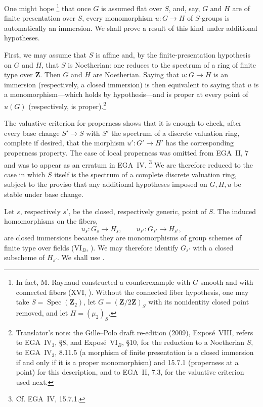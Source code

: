 One might hope\begingroup
\renewcommand{\thefootnote}{(\(\ast\))}%
\footnote[1]{In fact, M. Raynaud constructed a counterexample with \(G\)
smooth and with connected fibers (XVI, ). Without the connected
fiber hypothesis, one may take
\(S=\operatorname{Spec}(\mathbf Z_2)\), let
\(G=(\mathbf Z/2\mathbf Z)_S\) with its nonidentity closed point removed,
and let \(H=(\mu_2)_S\).}%
\endgroup
that once \(G\) is assumed flat over \(S\), and, say, \(G\) and \(H\) are
of finite presentation over \(S\), every monomorphism \(u:G\to H\) of
\(S\)-groups is automatically an immersion. We shall prove a result of this
kind under additional hypotheses.

First, we may assume that \(S\) is affine and, by the finite-presentation
hypothesis on \(G\) and \(H\), that \(S\) is Noetherian: one reduces to the
spectrum of a ring of finite type over \(\mathbf Z\). Then \(G\) and
\(H\) are Noetherian. Saying that \(u:G\to H\) is an immersion
(respectively, a closed immersion) is then equivalent to saying that \(u\)
is a monomorphism---which holds by hypothesis---and is proper at every point
of \(u(G)\) (respectively, is proper).\footnote{Translator's note: the Gille--Polo draft
re-edition (2009), Expos\'e~VIII, refers to EGA~IV\(_3\), \S8, and Expos\'e~VI\(_B\), \S10, for the
reduction to a Noetherian \(S\), to EGA~IV\(_3\), 8.11.5 (a morphism of finite presentation is a
closed immersion if and only if it is a proper monomorphism) and 15.7.1 (properness at a point) for
this description, and to EGA~II, 7.3, for the valuative criterion used next.}

The valuative criterion for properness shows that it is enough to check,
after every base change \(S'\to S\) with \(S'\) the spectrum of a discrete
valuation ring, complete if desired, that the morphism
\(u':G'\to H'\) has the corresponding properness property. The case of
local properness was omitted from EGA~II, 7 and was to appear as an
erratum in EGA~IV.\begingroup
\renewcommand{\thefootnote}{(\(\ast\))}%
\footnote[0]{Cf. EGA~IV, 15.7.1.}%
\endgroup
We are therefore reduced to the case in which \(S\) itself is the spectrum
of a complete discrete valuation ring, subject to the proviso that any
additional hypotheses imposed on \(G,H,u\) be stable under base change.

Let \(s\), respectively \(s'\), be the closed, respectively generic, point
of \(S\). The induced homomorphisms on the fibers,
\[
  u_s:G_s\longrightarrow H_s,
  \qquad
  u_{s'}:G_{s'}\longrightarrow H_{s'},
\]
are closed immersions because they are monomorphisms of group schemes of
finite type over fields (VI\(_B\), ). We may therefore identify
\(G_{s'}\) with a closed subscheme of \(H_{s'}\). We shall use .

